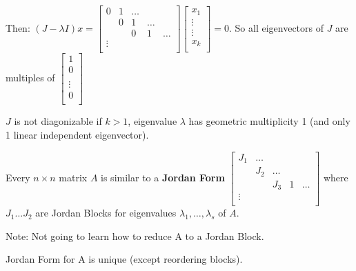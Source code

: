 Then: $(J-\lambda I)x = \begin{bmatrix}
    0 & 1 & \hdots \\  & 0 & 1 & \hdots \\ & & 0 & 1 & \hdots\\  \vdots \\
\end{bmatrix} \begin{bmatrix}
    x_1 \\  \vdots \\ \vdots \\  x_k \\
\end{bmatrix} = 0$. So all eigenvectors of $J$ are multiples of  $\begin{bmatrix}
    1 \\  0 \\ \\ \vdots \\  0 \\
\end{bmatrix}$

$J$ is not diagonizable if $k>1$, eigenvalue $\lambda$ has geometric multiplicity 1 (and only 1 linear independent eigenvector).

\begin{theorem} Every $n \times n$ matrix $A$ is similar to a \textbf{Jordan Form} $\begin{bmatrix}
    J_1 & \hdots \\  & J_2 & \hdots \\ & & J_3 & 1 & \hdots\\  \vdots \\
\end{bmatrix}$ where $J_1 \hdots J_2$ are Jordan Blocks for eigenvalues $\lambda_1, \hdots , \lambda_s$ of $A$.
\end{theorem}

Note: Not going to learn how to reduce A to a Jordan Block.

Jordan Form for A is unique (except reordering blocks).

